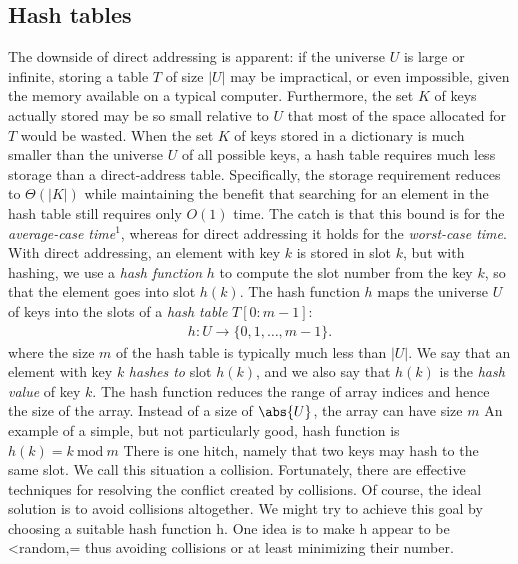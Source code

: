 \documentclass{report}
\begin{document}
\subsection{Hash tables}
\bigbreak \noindent 
The downside of direct addressing is apparent: if the universe \( U \) is large or infinite, storing a table \( T \) of size \( |U| \) may be impractical, or even impossible, given the memory available on a typical computer. Furthermore, the set \( K \) of keys actually stored may be so small relative to \( U \) that most of the space allocated for \( T \) would be wasted.
\bigbreak \noindent 
When the set \( K \) of keys stored in a dictionary is much smaller than the universe \( U \) of all possible keys, a hash table requires much less storage than a direct-address table. Specifically, the storage requirement reduces to \( \Theta(|K|) \) while maintaining the benefit that searching for an element in the hash table still requires only \( O(1) \) time. The catch is that this bound is for the \textit{average-case time}\(^1\), whereas for direct addressing it holds for the \textit{worst-case time}.
\bigbreak \noindent 
With direct addressing, an element with key \( k \) is stored in slot \( k \), but with hashing, we use a \textit{hash function} \( h \) to compute the slot number from the key \( k \), so that the element goes into slot \( h(k) \). The hash function \( h \) maps the universe \( U \) of keys into the slots of a \textit{hash table} \( T[0 : m - 1] \):
\bigbreak \noindent 
\begin{align*}
    h : U \rightarrow \{0, 1, \dots, m - 1\}
.\end{align*}
\bigbreak \noindent 
where the size \( m \) of the hash table is typically much less than \( |U| \). We say that an element with key \( k \) \textit{hashes to} slot \( h(k) \), and we also say that \( h(k) \) is the \textit{hash value} of key \( k \). The hash function reduces the range of array indices and hence the size of the array. Instead of a size of $\abs{U}$, the array can have size $m$
\bigbreak \noindent 
An example of a simple, but not particularly good, hash function is $h(k) = k\ \text{mod} \ m $
\bigbreak \noindent 
There is one hitch, namely that two keys may hash to the same slot. We call this situation a collision. Fortunately, there are effective techniques for resolving the conflict created by collisions.
\bigbreak \noindent 
Of course, the ideal solution is to avoid collisions altogether. We might try to
achieve this goal by choosing a suitable hash function h. One idea is to make h appear to be <random,= thus avoiding collisions or at least minimizing their number.
\end{document}
